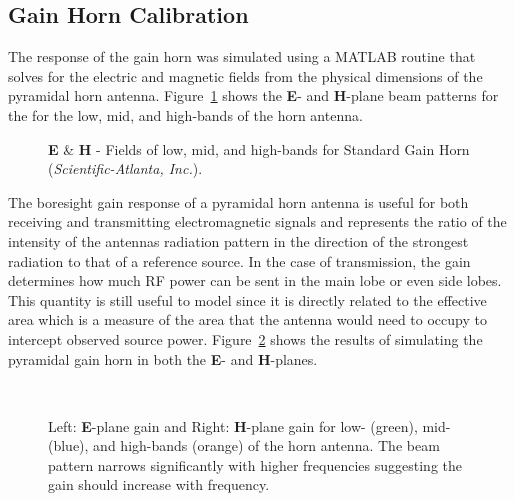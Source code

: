 \subsection{Gain Horn Calibration}
\label{ss:gainHorn}
The response of the gain horn was simulated using a MATLAB routine that solves for the electric and magnetic fields from the physical dimensions of the pyramidal horn antenna.  Figure~\ref{fig:fieldPattern} shows the \textbf{E}- and \textbf{H}-plane beam patterns for the for the low, mid, and high-bands of the horn antenna.

\begin{figure}[htbp]
\centering
\epsfxsize=4.5in
\caption{\textbf{E} \& \textbf{H} - Fields of low, mid, and high-bands for Standard Gain Horn (\textit{Sci\-ent\-ific-Atlanta, Inc.}).}
\label{fig:fieldPattern}
\end{figure}

The boresight gain response of a pyramidal horn antenna is useful for both receiving and transmitting electromagnetic signals and represents the ratio of the intensity of the antennas radiation pattern in the direction of the strongest radiation to that of a reference source.  In the case of transmission, the gain determines how much RF power can be sent in the main lobe or even side lobes.  This quantity is still useful to model since it is directly related to the effective area which is a measure of the area that the antenna would need to occupy to intercept observed source power.  Figure~\ref{fig:gainPattern} shows the results of simulating the pyramidal gain horn in both the \textbf{E}- and \textbf{H}-planes.

\begin{figure}[htbp]
\centerline{
\mbox{
\epsfxsize=4.2in\hspace{-17mm}
\epsfxsize=4.2in
}}
\caption{Left: \textbf{E}-plane gain and Right: \textbf{H}-plane gain for low- (green), mid- (blue), and high-bands (orange) of the horn antenna.  The beam pattern narrows significantly with higher frequencies suggesting the gain should increase with frequency.}
\label{fig:gainPattern}
\end{figure}

